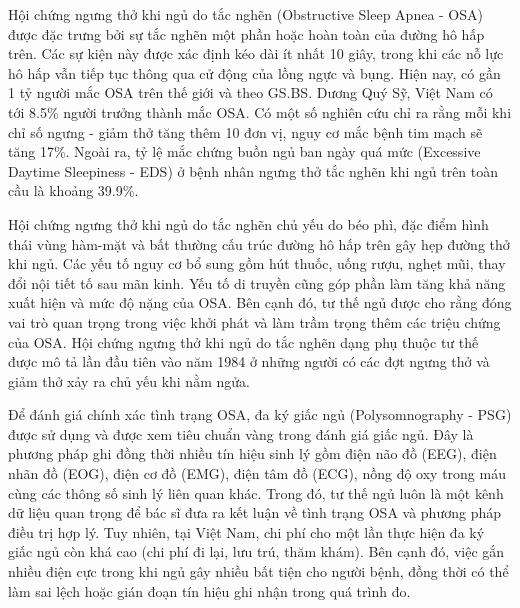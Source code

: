 Hội chứng ngưng thở khi ngủ do tắc nghẽn (Obstructive Sleep Apnea - OSA) được
đặc trưng bởi sự tắc nghẽn một phần hoặc hoàn toàn của đường hô hấp trên. Các
sự kiện này được xác định kéo dài ít nhất 10 giây, trong khi các nỗ lực hô hấp
vẫn tiếp tục thông qua cử động của lồng ngực và bụng.
Hiện nay, có gần 1 tỷ người mắc OSA trên thế giới và theo GS.BS. Dương Quý Sỹ,
Việt Nam có tới 8.5\% người trưởng thành mắc OSA.
Có một số nghiên cứu chỉ ra rằng mỗi khi chỉ số ngưng - giảm thở tăng thêm 10
đơn vị, nguy cơ mắc bệnh tim mạch sẽ tăng 17\%.
Ngoài ra, tỷ lệ mắc chứng buồn ngủ ban ngày quá mức (Excessive Daytime
Sleepiness - EDS) ở bệnh nhân ngưng thở tắc nghẽn khi ngủ trên toàn cầu là
khoảng 39.9\%.

Hội chứng ngưng thở khi ngủ do tắc nghẽn chủ yếu do béo phì, đặc điểm hình thái
vùng hàm-mặt và bất thường cấu trúc đường hô hấp trên gây hẹp đường thở khi
ngủ.
Các yếu tố nguy cơ bổ sung gồm hút thuốc, uống rượu, nghẹt mũi, thay đổi nội
tiết tố sau mãn kinh. Yếu tố di truyền cũng góp phần làm tăng khả năng xuất
hiện và mức độ nặng của OSA. Bên cạnh đó, tư thế ngủ được cho rằng đóng vai trò
quan trọng trong việc khởi phát và làm trầm trọng thêm các triệu chứng của OSA.
Hội chứng ngưng thở khi ngủ do tắc nghẽn dạng phụ thuộc tư thế được mô tả lần
đầu tiên vào năm 1984 ở những người có các đợt ngưng thở và giảm thở xảy ra chủ
yếu khi nằm ngửa.

Để đánh giá chính xác tình trạng OSA, đa ký giấc ngủ
(Polysomnography - PSG) được sử dụng và được xem tiêu chuẩn vàng trong đánh giá giấc ngủ.
Đây là phương pháp ghi đồng thời nhiều tín hiệu sinh lý
gồm điện não đồ (EEG), điện nhãn đồ (EOG), điện cơ đồ (EMG), điện tâm đồ (ECG), nồng độ oxy trong máu cùng các thông số sinh lý liên quan khác.
Trong đó, tư thế ngủ luôn là một kênh dữ liệu quan trọng để bác sĩ đưa ra kết
luận về tình trạng OSA và phương pháp điều trị hợp lý. Tuy nhiên, tại Việt Nam,
chi phí cho một lần thực hiện đa ký giấc ngủ còn khá cao (chi phí đi lại, lưu
trú, thăm khám). Bên cạnh đó, việc gắn nhiều điện cực trong khi ngủ gây nhiều
bất tiện cho người bệnh, đồng thời có thể làm sai lệch hoặc gián đoạn tín hiệu
ghi nhận trong quá trình đo.

